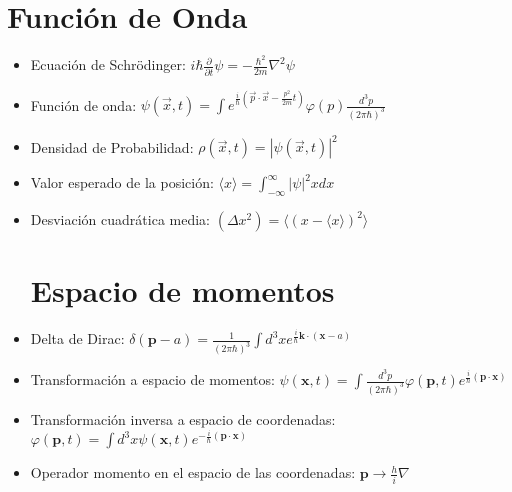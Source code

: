 \documentclass[a4,12pt]{aleph-notas}
\begin{document}
\encabezado

\section{Función de Onda}
\begin{itemize}
    \item Ecuación de Schrödinger: $i\hbar\frac{\partial}{\partial t} \psi=-\frac{\hbar^2}{2m}\nabla^2\psi$
    \item Función de onda: $\psi(\vec{x},t)=\int e^{\frac{i}{\hbar}\left(\vec{p}\cdot\vec{x}-\frac{p^2}{2m}t\right)}\varphi(p)\frac{d^3 p}{(2 \pi \hbar)^3}$
    \item Densidad de Probabilidad: $\rho(\vec{x},t)=\left\vert \psi(\vec{x},t) \right\vert^2$
    \item Valor esperado de la posición: $\langle x\rangle=\int_{-\infty}^{\infty}\left\vert \psi \right\vert^2 x dx$
    \item Desviación cuadrática media: $\left( \Delta x^2\right)=\langle(x-\langle x\rangle)^2 \rangle$
    \section{Espacio de momentos}
    \item Delta de Dirac: $\delta(\textbf{p}-a)=\frac{1}{(2\pi\hbar)^3}\int d^3x e^{\frac{i}{\hbar}\textbf{k} \cdot (\textbf{x}-a)}$
    \item Transformación a espacio de momentos: $\psi(\textbf{x},t)=\int\frac{d^3p}{(2\pi\hbar)^3}\varphi(\textbf{p},t)e^{\frac{i}{\hbar}(\textbf{p}\cdot\textbf{x})}$
    \item Transformación inversa a espacio de coordenadas: $\varphi(\textbf{p},t)=\int d^3x\psi(\textbf{x},t)e^{-\frac{i}{\hbar}(\textbf{p}\cdot\textbf{x})}$
    \item Operador momento en el espacio de las coordenadas: $\textbf{p} \rightarrow \frac{h}{i}\nabla$
\end{itemize}
\end{document}
